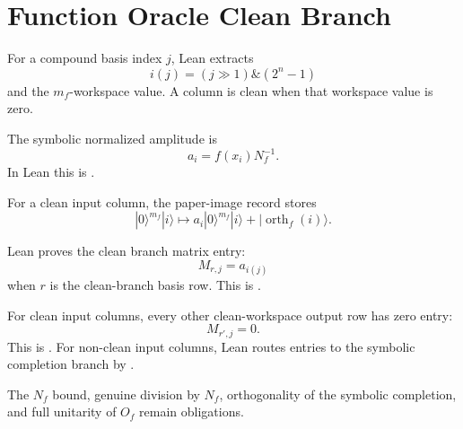 \section{Function Oracle Clean Branch}

For a compound basis index \(j\), Lean extracts
\[
  i(j)=(j\gg1)\mathbin{\&}(2^n-1)
\]
and the \(m_f\)-workspace value.  A column is clean when that workspace value is
zero.

The symbolic normalized amplitude is
\[
  a_i=f(x_i)N_f^{-1}.
\]
In Lean this is .

For a clean input column, the paper-image record stores
\[
  |0\rangle^{m_f}|i\rangle
  \mapsto
  a_i|0\rangle^{m_f}|i\rangle
  +|\operatorname{orth}_f(i)\rangle .
\]

Lean proves the clean branch matrix entry:
\[
  M_{r,j}=a_{i(j)}
\]
when \(r\) is the clean-branch basis row.  This is
.

For clean input columns, every other clean-workspace output row has zero entry:
\[
  M_{r',j}=0.
\]
This is .
For non-clean input columns, Lean routes entries to the symbolic completion
branch by .

The \(N_f\) bound, genuine division by \(N_f\), orthogonality of the symbolic
completion, and full unitarity of \(O_f\) remain obligations.
